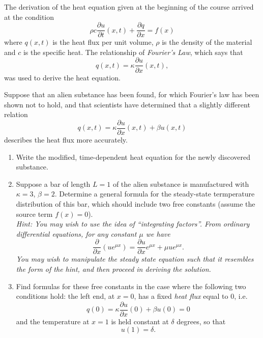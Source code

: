 
The derivation of the heat equation given at the beginning of the course arrived at the condition 
\[
\rho c \frac{\partial u}{\partial t} (x,t) + \frac{\partial q}{\partial x} = f(x)
\]
where $q(x,t)$ is the heat flux per unit volume, $\rho$ is the density of the material and $c$ is the specific heat.  The relationship of \textit{Fourier's Law}, which says that 
\[
q(x,t) = \kappa \frac{\partial u}{\partial x}(x,t),
\]
was used to derive the heat equation.  

Suppose that an alien substance has been found, for which Fourier's law has been shown not to hold, and that scientists have determined that a slightly different relation
\[
q(x,t) = \kappa\frac{\partial u}{\partial x}(x,t) + \beta u(x,t)
\]
describes the heat flux more accurately.  

\begin{enumerate}
\item Write the modified, time-dependent heat equation for the newly discovered substance.  

\item Suppose a bar of length $L=1$ of the alien substance is manufactured with $\kappa = 3$, $\beta = 2$.  Determine a general formula for the steady-state termperature distribution of this bar, which should include two free constants (assume the source term $f(x)=0$). \\ \vspace{0.1em} \emph{Hint: You may wish to use the idea of ``integrating factors''.  From ordinary differential equations, for any constant $\mu$ we have}
\[
\frac{\partial}{\partial x} \left( u e^{\mu x}\right) = \frac{\partial u}{\partial x} e^{\mu x} + \mu u e^{\mu x}.
\]
\emph{You may wish to manipulate the steady state equation such that it resembles the form of the hint, and then proceed in deriving the solution.}
\item Find formulas for these free constants in the case where the following two conditions hold: the left end, at $x=0$, has a fixed \textit{heat flux} equal to $0$, i.e.
\[
q(0) = \kappa\frac{\partial u}{\partial x}(0) + \beta u(0)= 0
\]
and the temperature at $x=1$ is held constant at $\delta$ degrees, so that
\[
u(1) = \delta.
\]



\end{enumerate}